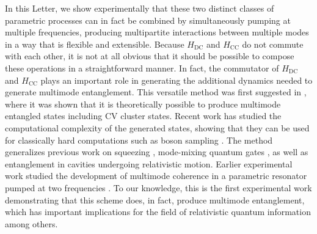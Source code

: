 \documentclass[prl,10pt,twocolumn,superscriptaddress,notitlepage,floatfix,amssymb]{revtex4}
\begin{document}
In this Letter, we show experimentally that these two distinct classes of parametric processes can in fact be combined by simultaneously pumping at multiple frequencies, producing multipartite interactions between multiple modes in a way that is flexible and extensible. Because $H_{\text{DC}}$ and $H_{\text{CC}}$ do not commute with each other, it is not at all obvious that it should be possible to compose these operations in a straightforward manner.  In fact, the commutator of $H_{\text{DC}}$ and $H_{\text{CC}}$ plays an important role in generating the additional dynamics needed to generate multimode entanglement. This versatile method was first suggested in \cite{Bruschi:2016hu}, where it was shown that it is theoretically possible to produce multimode entangled states including CV cluster states.  Recent work has studied the computational complexity of the generated states, showing that they can be used for classically hard computations such as boson sampling \cite{Peropadre:2018dy}. The method generalizes previous work on squeezing \cite{Bruschi:2013cq}, mode-mixing quantum gates \cite{Bruschi:2013ka}, as well as entanglement \cite{Friis:2012ft,Friis:2013fn} in cavities undergoing relativistic motion. Earlier experimental work studied the development of multimode coherence in a parametric resonator pumped at two frequencies \cite{Paraoanu:2016fqa}.  To our knowledge, this is the first experimental work demonstrating that this scheme does, in fact, produce multimode entanglement, which has important implications for the field of relativistic quantum information among others.

\end{document}
